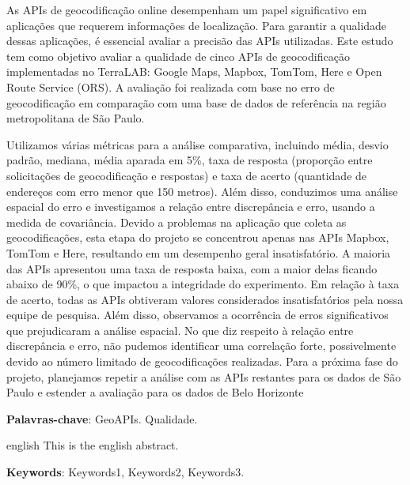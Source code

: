 
\setlength{\absparsep}{18pt} %
\begin{resumo}

  As APIs de geocodificação online desempenham um papel significativo em aplicações que requerem informações de localização. Para garantir a qualidade dessas aplicações, é essencial avaliar a precisão das APIs utilizadas. Este estudo tem como objetivo avaliar a qualidade de cinco APIs de geocodificação implementadas no TerraLAB: Google Maps, Mapbox, TomTom, Here e Open Route Service (ORS). A avaliação foi realizada com base no erro de geocodificação em comparação com uma base de dados de referência na região metropolitana de São Paulo.
  
  Utilizamos várias métricas para a análise comparativa, incluindo média, desvio padrão, mediana, média aparada em 5\%, taxa de resposta (proporção entre solicitações de geocodificação e respostas) e taxa de acerto (quantidade de endereços com erro menor que 150 metros). Além disso, conduzimos uma análise espacial do erro e investigamos a relação entre discrepância e erro, usando a medida de covariância. Devido a problemas na aplicação que coleta as geocodificações, esta etapa do projeto se concentrou apenas nas APIs Mapbox, TomTom e Here, resultando em um desempenho geral insatisfatório.
  A maioria das APIs apresentou uma taxa de resposta baixa, com a maior delas ficando abaixo de 90\%, o que impactou a integridade do experimento. Em relação à taxa de acerto, todas as APIs obtiveram valores considerados insatisfatórios pela nossa equipe de pesquisa. Além disso, observamos a ocorrência de erros significativos que prejudicaram a análise espacial. No que diz respeito à relação entre discrepância e erro, não pudemos identificar uma correlação forte, possivelmente devido ao número limitado de geocodificações realizadas.
  Para a próxima fase do projeto, planejamos repetir a análise com as APIs restantes para os dados de São Paulo e estender a avaliação para os dados de Belo Horizonte
  

 \vspace{\onelineskip}
 \noindent
 \textbf{Palavras-chave}: GeoAPIs. Qualidade. 

\end{resumo}

\begin{resumo}[Abstract]
 \begin{otherlanguage*}{english}
   This is the english abstract.


   \vspace{\onelineskip}
   \noindent 
   \textbf{Keywords}: Keywords1, Keywords2, Keywords3.
 \end{otherlanguage*}
\end{resumo}